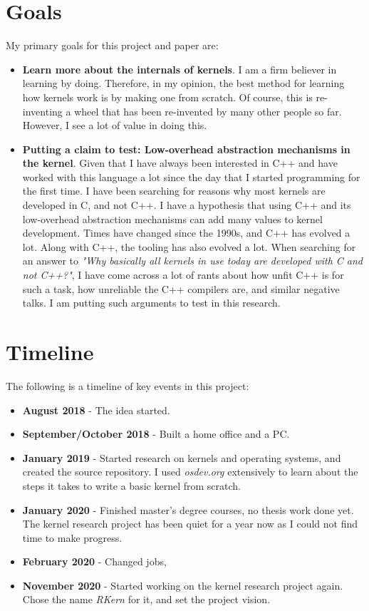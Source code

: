 \documentclass[a4paper,12pt,twoside]{report}
\begin{document}
	    \section{Goals}
	        My primary goals for this project and paper are:
	        \begin{itemize}
	            \item \textbf{Learn more about the internals of kernels}.
	            I am a firm believer in learning by doing. Therefore, in my opinion, the best method for learning how kernels work is by making one from scratch. Of course, this is re-inventing a wheel that has been re-invented by many other people so far. However, I see a lot of value in doing this.
	
	            \item \textbf{Putting a claim to test: Low-overhead abstraction mechanisms in the kernel}.            
	            Given that I have always been interested in C++ and have worked with this language a lot since the day that I started programming for the first time. I have been searching for reasons why most kernels are developed in C, and not C++. I have a hypothesis that using C++ and its low-overhead abstraction mechanisms can add many values to kernel development. Times have changed since the 1990s, and C++ has evolved a lot. Along with C++, the tooling has also evolved a lot. When searching for an answer to \textit{"Why basically all kernels in use today are developed with C and not C++?"}, I have come across a lot of rants about how unfit C++ is for such a task, how unreliable the C++ compilers are, and similar negative talks. I am putting such arguments to test in this research.
	        \end{itemize}
	
	    \section*{Timeline}
	        The following is a timeline of key events in this project:
	        \begin{itemize}
	            \item \textbf{August 2018} - The idea started.
	            \item \textbf{September/October 2018} - Built a home office and a PC.
	            \item \textbf{January 2019} - Started research on kernels and operating systems, and created the source repository. I used \textit{osdev.org}\cite{osdev} extensively to learn about the steps it takes to write a basic kernel from scratch.
	            \item \textbf{January 2020} - Finished master's degree courses, no thesis work done yet. The kernel research project has been quiet for a year now as I could not find time to make progress.
	            \item \textbf{February 2020} - Changed jobs,
	            \item \textbf{November 2020} - Started working on the kernel research project again. Chose the name \textit{RKern} for it, and set the project vision.
	        \end{itemize}
    
\end{document}
